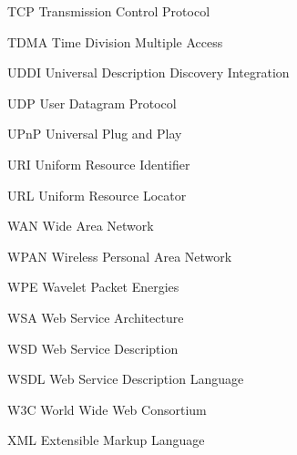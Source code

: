   {TCP}
  {Transmission Control Protocol}

  {TDMA}
  {Time Division Multiple Access}

  {UDDI}
  {Universal Description Discovery Integration}

  {UDP}
  {User Datagram Protocol}

  {UPnP}
  {Universal Plug and Play}

  {URI}
  {Uniform Resource Identifier}

  {URL}
  {Uniform Resource Locator}

  {WAN}
  {Wide Area Network}

  {WPAN}
  {Wireless Personal Area Network}

  {WPE}
  {Wavelet Packet Energies}

  {WSA}
  {Web Service Architecture}

  {WSD}
  {Web Service Description}

  {WSDL}
  {Web Service Description Language}

  {W3C}
  {World Wide Web Consortium}

  {XML}
  {Extensible Markup Language}

